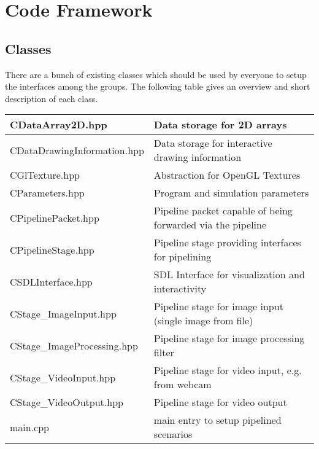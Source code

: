 \section{Code Framework}



\subsection{Classes}
There are a bunch of existing classes which should be used by everyone to setup
the interfaces among the groups.
The following table gives an overview and short description of each class.

\noindent
\begin{tabular}{|l|l|}
	\hline
	CDataArray2D.hpp				&
		Data storage for 2D arrays							\\
	\hline
	CDataDrawingInformation.hpp		&
		Data storage for interactive drawing information	\\
	\hline
	CGlTexture.hpp					&
		Abstraction for OpenGL Textures						\\
	\hline
	CParameters.hpp					&
		Program and simulation parameters					\\
	\hline
	CPipelinePacket.hpp				&
		Pipeline packet capable of being forwarded via the pipeline	\\
	\hline
	CPipelineStage.hpp				&
		Pipeline stage providing interfaces for pipelining	\\
	\hline
	CSDLInterface.hpp				&
		SDL Interface for visualization and interactivity	\\
	\hline
	CStage\_ImageInput.hpp			&
		Pipeline stage for image input (single image from file)	\\
	\hline
	CStage\_ImageProcessing.hpp		&
		Pipeline stage for image processing filter			\\
	\hline
	CStage\_VideoInput.hpp			&
		Pipeline stage for video input, e.g.\,from webcam	\\
	\hline
	CStage\_VideoOutput.hpp			&
		Pipeline stage for video output				\\			
	\hline
	main.cpp						&
		main entry to setup pipelined scenarios		\\
	\hline
\end{tabular}


